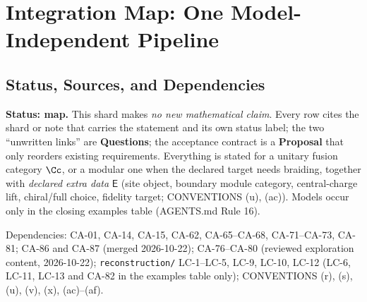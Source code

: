 
\section{Integration Map: One Model-Independent Pipeline}
\label{sec:integration-map}

\subsection{Status, Sources, and Dependencies}

\textbf{Status: map.}  This shard makes \emph{no new mathematical claim}.
Every row cites the shard or note that carries the statement and its own
status label; the two ``unwritten links'' are \textbf{Questions}; the
acceptance contract is a \textbf{Proposal} that only reorders existing
requirements.  Everything is stated for a unitary fusion category \(\Cc\),
or a modular one when the declared target needs braiding, together with
\emph{declared extra data} \(\mathsf E\) (site object, boundary module
category, central-charge lift, chiral/full choice, fidelity target;
CONVENTIONS (u), (ac)).  Models occur only in the closing examples table
(AGENTS.md Rule 16).

Dependencies: CA-01, CA-14, CA-15, CA-62, CA-65--CA-68, CA-71--CA-73,
CA-81; CA-86 and CA-87 (merged 2026-10-22); CA-76--CA-80 (reviewed exploration content, 2026-10-22);
\texttt{reconstruction/} LC-1--LC-5, LC-9, LC-10, LC-12 (LC-6, LC-11, LC-13 and CA-82 in the examples table only);
CONVENTIONS (r), (s), (u), (v), (x), (ac)--(af).

